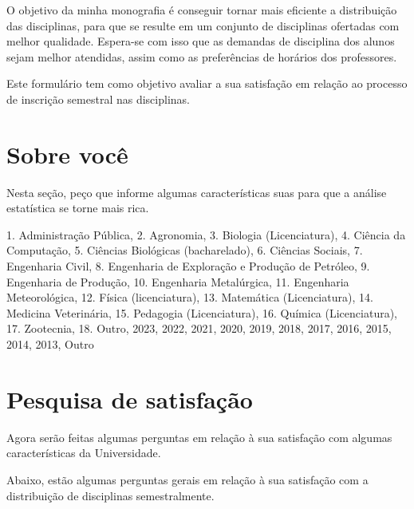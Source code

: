 \begin{apendicesenv}
\begin{Form}[action=mailto:joaovitorfd2000@gmail.com, encoding=html, method=post]
    O objetivo da minha monografia é conseguir tornar mais eficiente a distribuição das disciplinas, para que se resulte em um conjunto de disciplinas ofertadas com melhor qualidade. Espera-se com isso que as demandas de disciplina dos alunos sejam melhor atendidas, assim como as preferências de horários dos professores.

    Este formulário tem como objetivo avaliar a sua satisfação em relação ao processo de inscrição semestral nas disciplinas.

    \section*{Sobre você}

    Nesta seção, peço que informe algumas características suas para que a análise estatística se torne mais rica.

    \begin{enumerate}
      {
        1. Administração Pública,
        2. Agronomia,
        3. Biologia (Licenciatura),
        4. Ciência da Computação,
        5. Ciências Biológicas (bacharelado),
        6. Ciências Sociais,
        7. Engenharia Civil,
        8. Engenharia de Exploração e Produção de Petróleo,
        9. Engenharia de Produção,
        10. Engenharia Metalúrgica,
        11. Engenharia Meteorológica,
        12. Física (licenciatura),
        13. Matemática (Licenciatura),
        14. Medicina Veterinária,
        15. Pedagogia (Licenciatura),
        16. Química (Licenciatura),
        17. Zootecnia,
        18. Outro,
      }
      { 2023, 2022, 2021, 2020, 2019, 2018, 2017, 2016, 2015, 2014, 2013, Outro }
    \end{enumerate}

    \section*{Pesquisa de satisfação}

    Agora serão feitas algumas perguntas em relação à sua satisfação com algumas características da Universidade.

    Abaixo, estão algumas perguntas gerais em relação à sua satisfação com a distribuição de disciplinas semestralmente.


\end{Form}
\end{apendicesenv}
